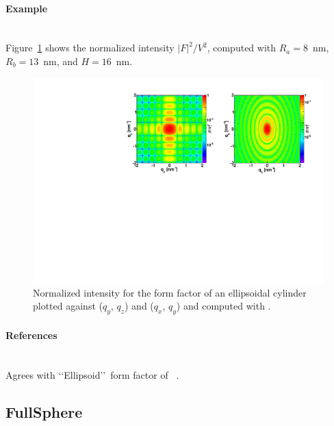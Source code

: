 \paragraph{Example}\strut\\
Figure~\ref{fig:FFellipscylinderEx} shows the normalized intensity
$|F|^2/V^2$, computed with $R_a=8$~nm, $R_b=13$~nm, and $H=16$~nm.
\begin{figure}[h]
\begin{center}
\includegraphics[angle=-90,width=\textwidth]{fig/ff/figffellipscylinder.pdf}
\end{center}
\caption{Normalized intensity for the form factor of an ellipsoidal
  cylinder plotted against ($q_y$, $q_z$) and ($q_x$,
  $q_y$) and computed with .}
\label{fig:FFellipscylinderEx}
\end{figure}

\paragraph{References}\strut\\
Agrees with \lq\lq Ellipsoid\rq\rq\ form factor of \IsGISAXS~\cite{Laz02}.

\clearpage
\subsection{FullSphere} \label{sec:FullSphere}

